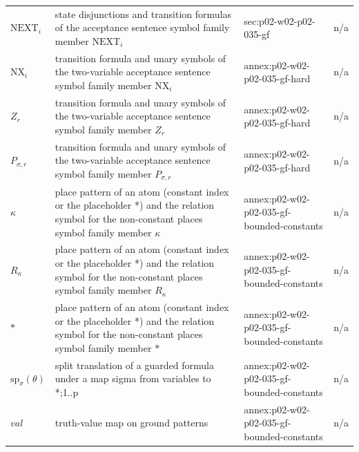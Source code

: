 \begin{longtable}{@{}p{}p{}p{}p{}@{}}
\(\mathrm{NEXT}_i\) & state disjunctions and transition formulas of the acceptance sentence symbol family member \(\mathrm{NEXT}_i\) & sec:\allowbreak{}p02-\allowbreak{}w02-\allowbreak{}p02-\allowbreak{}035-\allowbreak{}gf & n/a \\
\(\mathrm{NX}_i\) & transition formula and unary symbols of the two-variable acceptance sentence symbol family member \(\mathrm{NX}_i\) & annex:\allowbreak{}p02-\allowbreak{}w02-\allowbreak{}p02-\allowbreak{}035-\allowbreak{}gf-\allowbreak{}hard & n/a \\
\(Z_r\) & transition formula and unary symbols of the two-variable acceptance sentence symbol family member \(Z_r\) & annex:\allowbreak{}p02-\allowbreak{}w02-\allowbreak{}p02-\allowbreak{}035-\allowbreak{}gf-\allowbreak{}hard & n/a \\
\(P_{\sigma,r}\) & transition formula and unary symbols of the two-variable acceptance sentence symbol family member \(P_{\sigma,r}\) & annex:\allowbreak{}p02-\allowbreak{}w02-\allowbreak{}p02-\allowbreak{}035-\allowbreak{}gf-\allowbreak{}hard & n/a \\
\(\kappa\) & place pattern of an atom (constant index or the placeholder *) and the relation symbol for the non-constant places symbol family member \(\kappa\) & annex:\allowbreak{}p02-\allowbreak{}w02-\allowbreak{}p02-\allowbreak{}035-\allowbreak{}gf-\allowbreak{}bounded-\allowbreak{}constants & n/a \\
\(R_\kappa\) & place pattern of an atom (constant index or the placeholder *) and the relation symbol for the non-constant places symbol family member \(R_\kappa\) & annex:\allowbreak{}p02-\allowbreak{}w02-\allowbreak{}p02-\allowbreak{}035-\allowbreak{}gf-\allowbreak{}bounded-\allowbreak{}constants & n/a \\
\(\ast\) & place pattern of an atom (constant index or the placeholder *) and the relation symbol for the non-constant places symbol family member \(\ast\) & annex:\allowbreak{}p02-\allowbreak{}w02-\allowbreak{}p02-\allowbreak{}035-\allowbreak{}gf-\allowbreak{}bounded-\allowbreak{}constants & n/a \\
\(\mathrm{sp}_\sigma(\theta)\) & split translation of a guarded formula under a map sigma from variables to {*;1..p} & annex:\allowbreak{}p02-\allowbreak{}w02-\allowbreak{}p02-\allowbreak{}035-\allowbreak{}gf-\allowbreak{}bounded-\allowbreak{}constants & n/a \\
\(\mathit{val}\) & truth-value map on ground patterns & annex:\allowbreak{}p02-\allowbreak{}w02-\allowbreak{}p02-\allowbreak{}035-\allowbreak{}gf-\allowbreak{}bounded-\allowbreak{}constants & n/a \\

\end{longtable}
